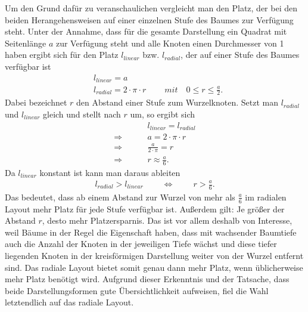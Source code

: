 Um den Grund dafür zu veranschaulichen vergleicht man den Platz, der bei den beiden Herangehensweisen auf einer einzelnen Stufe des Baumes zur Verfügung steht. Unter der Annahme, dass für die gesamte Darstellung ein Quadrat mit Seitenlänge $a$ zur Verfügung steht und alle Knoten einen Durchmesser von 1 haben ergibt sich für den Platz $l_{linear}$ bzw. $l_{radial}$, der auf einer Stufe des Baumes verfügbar ist 
\begin{align*}
&l_{linear} = a\\
&l_{radial} = 2 \cdot \pi \cdot r\mspace{40mu} mit\quad 0\leq r \leq \frac{a}{2} .
\end{align*}
Dabei bezeichnet $r$ den Abstand einer Stufe zum Wurzelknoten. Setzt man $l_{radial}$ und $l_{linear}$ gleich und stellt nach $r$ um, so ergibt sich
\begin{align*}
&l_{linear} = l_{radial}\\
\Rightarrow \mspace{40mu} &a = 2 \cdot \pi \cdot r\\
\Rightarrow \mspace{40mu} &\frac{a}{2 \cdot \pi} = r\\
\Rightarrow \mspace{40mu} &r \approx \frac{a}{6}.
\end{align*}
Da $l_{linear}$ konstant ist kann man daraus ableiten
\begin{align*}
l_{radial} > l_{linear} \mspace{40mu} \Leftrightarrow  \mspace{40mu} r > \frac{a}{6}.
\end{align*}
Das bedeutet, dass ab einem Abstand zur Wurzel von mehr als $\frac{a}{6}$ im radialen Layout mehr Platz für jede Stufe verfügbar ist. Außerdem gilt: Je größer der Abstand $r$, desto mehr Platzersparnis. Das ist vor allem deshalb von Interesse, weil Bäume in der Regel die Eigenschaft haben, dass mit wachsender Baumtiefe auch die Anzahl der Knoten in der jeweiligen Tiefe wächst und diese tiefer liegenden Knoten in der kreisförmigen Darstellung weiter von der Wurzel entfernt sind. Das radiale Layout bietet somit genau dann mehr Platz, wenn üblicherweise mehr Platz benötigt wird.
Aufgrund dieser Erkenntnis und der Tatsache, dass beide Darstellungsformen gute Übersichtlichkeit aufweisen, fiel die Wahl letztendlich auf das radiale Layout.

